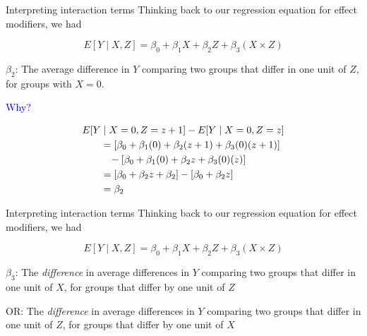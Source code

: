 \documentclass[10pt,t]{beamer}
\begin{document}
\begin{frame}{Interpreting interaction terms}
Thinking back to our regression equation for effect modifiers, we had

$$
E[Y \mid X, Z] = \beta_0 + \beta_1 X + \beta_2 Z + \beta_3 (X \times Z)
$$

$\beta_2$: The average difference in $Y$ comparing two groups that differ in one unit of $Z$, for groups with $X= 0$.

\vspace{0.3cm}

\textcolor{blue}{Why?} \pause 

\begin{align*}
E[Y & \mid X = 0, Z = z + 1] - E[Y  \mid X = 0, Z = z] \\
& = [\beta_0 + \beta_1 (0) + \beta_2 (z + 1) + \beta_3 (0)(z + 1)] \\
& \hspace{0.3cm}- [\beta_0 + \beta_1 (0) + \beta_2 z + \beta_3 (0)(z)] \\
& = [\beta_0 + \beta_2 z + \beta_2] - [\beta_0 + \beta_2 z] \\
& = \beta_2
\end{align*}
\end{frame}

\begin{frame}{Interpreting interaction terms}
Thinking back to our regression equation for effect modifiers, we had

$$
E[Y \mid X, Z] = \beta_0 + \beta_1 X + \beta_2 Z + \beta_3 (X \times Z)
$$

$\beta_3$: The \textit{difference} in average differences in $Y$ comparing two groups that differ in one unit of $X$, for groups that differ by one unit of $Z$ 

\vspace{0.3cm}

OR: The \textit{difference} in average differences in $Y$ comparing two groups that differ in one unit of $Z$, for groups that differ by one unit of $X$


\end{frame}
\end{document}
